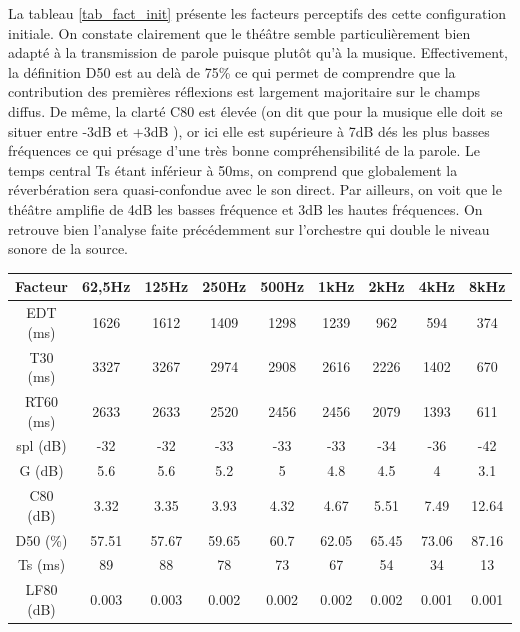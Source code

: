 \begin{figureth}
\begin{subfigureth}{0.61\textwidth}
		\caption{Source-images projetées sur les parois du théâtre jusqu'à -30dB.}
		\label{SI30dB}
	\end{subfigureth}
\caption{Source-images dans le théâtre d'Orange dans sa configuration initiale pour 1 million de rayons.}	
\label{SITheatre30}
\end{figureth}

La tableau \ref{tab_fact_init} présente les facteurs perceptifs des cette configuration initiale. On constate clairement que le théâtre semble particulièrement bien adapté à la transmission de parole puisque plutôt qu'à la musique. Effectivement, la définition \gls{D50} est au delà de 75\% ce qui permet de comprendre que la contribution des premières réflexions est largement majoritaire sur le champs diffus. De même, la clarté \gls{C80} est élevée (on dit que pour la musique elle doit se situer entre -3dB et +3dB \cite[p.59]{acoustique}), or ici elle est supérieure à 7dB dés les plus basses fréquences ce qui présage d'une très bonne compréhensibilité de la parole. Le temps central \gls{Ts} étant inférieur à 50ms, on comprend que globalement la réverbération sera quasi-confondue avec le son direct. Par ailleurs, on voit que le théâtre amplifie de 4dB les basses fréquence et 3dB les hautes fréquences. On retrouve bien l'analyse faite précédemment sur l'orchestre qui double le niveau sonore de la source.
% 
\begin{tableth} 
 \begin{tabular}{| *{9}{c|}} 
 \hline 
 Facteur & 62,5Hz & 125Hz & 250Hz & 500Hz & 1kHz & 2kHz & 4kHz & 8kHz \\ 
 \hline 
 \hline 
\gls{EDT} (ms)& 1626& 1612& 1409& 1298& 1239& 962& 594& 374 \\ 
 \hline 
\gls{T30} (ms)& 3327& 3267& 2974& 2908& 2616& 2226& 1402& 670 \\ 
 \hline 
\gls{RT60} (ms)& 2633& 2633& 2520& 2456& 2456& 2079& 1393& 611 \\ 
 \hline 
\gls{spl} (dB)& -32& -32& -33& -33& -33& -34& -36& -42 \\ 
 \hline 
\gls{G} (dB)& 5.6& 5.6& 5.2& 5& 4.8& 4.5& 4& 3.1 \\ 
 \hline 
\gls{C80} (dB)& 3.32& 3.35& 3.93& 4.32& 4.67& 5.51& 7.49& 12.64 \\ 
 \hline 
\gls{D50} (\%)& 57.51& 57.67& 59.65& 60.7& 62.05& 65.45& 73.06& 87.16 \\ 
 \hline 
\gls{Ts} (ms)& 89& 88& 78& 73& 67& 54& 34& 13 \\ 
 \hline 
\gls{LF80} (dB)& 0.003& 0.003& 0.002& 0.002& 0.002& 0.002& 0.001& 0.001 \\ 
 \hline 
\end{tabular} 
 \caption{Facteurs perceptifs pour une source en [0 ; 5.6 ; 42.8] et un auditeur en [0 ; -16.5 ; 43.9] et 1000000 rayons dans la configuration de référence.} 
 \label{tab_fact_init} 
 \end{tableth}


